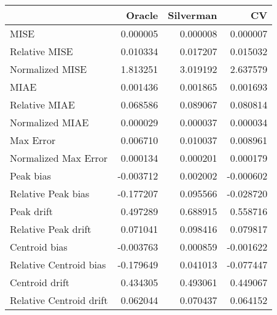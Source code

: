 \begin{tabular}{lrrr}
  \hline
 & Oracle & Silverman & CV \\ 
  \hline
MISE & 0.000005 & 0.000008 & 0.000007 \\ 
  Relative MISE & 0.010334 & 0.017207 & 0.015032 \\ 
  Normalized MISE & 1.813251 & 3.019192 & 2.637579 \\ 
  MIAE & 0.001436 & 0.001865 & 0.001693 \\ 
  Relative MIAE & 0.068586 & 0.089067 & 0.080814 \\ 
  Normalized MIAE & 0.000029 & 0.000037 & 0.000034 \\ 
  Max Error & 0.006710 & 0.010037 & 0.008961 \\ 
  Normalized Max Error & 0.000134 & 0.000201 & 0.000179 \\ 
  Peak bias & -0.003712 & 0.002002 & -0.000602 \\ 
  Relative Peak bias & -0.177207 & 0.095566 & -0.028720 \\ 
  Peak drift & 0.497289 & 0.688915 & 0.558716 \\ 
  Relative Peak drift & 0.071041 & 0.098416 & 0.079817 \\ 
  Centroid bias & -0.003763 & 0.000859 & -0.001622 \\ 
  Relative Centroid bias & -0.179649 & 0.041013 & -0.077447 \\ 
  Centroid drift & 0.434305 & 0.493061 & 0.449067 \\ 
  Relative Centroid drift & 0.062044 & 0.070437 & 0.064152 \\ 
   \hline
\end{tabular}
